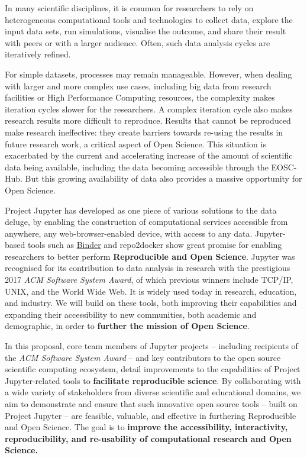 
In many scientific disciplines, it is common for researchers to rely on
heterogeneous computational tools and technologies to collect data, explore the
input data sets, run simulations, visualise the outcome, and share their result
with peers or with a larger audience. Often, such data analysis cycles are
iteratively refined.

For simple datasets, processes may remain manageable. However, when dealing with
larger and more complex use cases, including big data from research facilities
or High Performance Computing resources, the complexity makes iteration cycles
slower for the researchers. A complex iteration cycle also makes research
results more difficult to reproduce. Results that cannot be reproduced make
research ineffective: they create barriers towards re-using the results in
future research work, a critical aspect of Open Science. This situation is
exacerbated by the current and accelerating increase of the amount of scientific
data being available, including the data becoming accessible through the
EOSC-Hub. But this growing availability of data also provides a massive
opportunity for Open Science.

Project Jupyter has developed as one piece of various solutions to the data
deluge, by enabling the construction of computational services accessible from
anywhere, any web-browser-enabled device, with access to any data. Jupyter-based
tools such as \href{https://mybinder.org}{Binder} and repo2docker show great
promise for enabling researchers to better perform \textbf{Reproducible and Open
  Science}. Jupyter was recognised for its contribution to data analysis in
research with the prestigious 2017 \emph{ACM Software System Award}, of which
previous winners include TCP/IP, UNIX, and the World Wide Web. It is widely used
today in research, education, and industry. We will build on these tools, both
improving their capabilities and expanding their accessibility to new
communities, both academic and demographic, in order to \textbf{further the
  mission of Open Science}.

In this proposal, core team members of Jupyter projects -- including
recipients of the \emph{ACM Software System Award} -- and key contributors to
the open source scientific computing ecosystem, detail improvements to the
capabilities of Project Jupyter-related tools to \textbf{facilitate reproducible science}.
By collaborating with a wide variety
of stakeholders from diverse scientific and educational domains, we aim to
demonstrate and ensure that such innovative open source tools -- built on Project
Jupyter -- are feasible, valuable, and effective in furthering Reproducible and Open Science. The
goal is to \textbf{improve the accessibility, interactivity,
  reproducibility, and re-usability of computational research and Open Science.}


\clearpage

